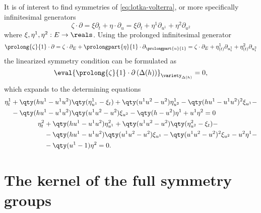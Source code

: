 It is of interest to find symmetries of \cref{eq:lotka-volterra}, or more specifically infinitesimal generators
\begin{equation}
  \zeta \cdot \partial = \xi \partial_t + \eta \cdot \partial_u = \xi \partial_t + \eta^1 \partial_{u^1} + \eta^2 \partial_{u^2}
\end{equation}
where \(\xi, \eta^1, \eta^2: E \to \reals\).
Using the prolonged infinitesimal generator
\begin{equation}
  \prolong{\zeta}{1} \cdot \partial = \zeta \cdot \partial_E + \prolongpart{\eta}{1} \cdot \partial_\prolongpart{u}{1} = \zeta \cdot \partial_E + \eta^1_{(t)} \partial_{u^1_t} + \eta^2_{(t)} \partial_{u^2_t}
\end{equation}
the linearized symmetry condition can be formulated as
\begin{equation} \label{eq:lotka-volterra-lin-symmetry}
  \eval{\prolong{\zeta}{1} \cdot \partial \left(\Delta(h)\right)}_{\variety_{\Delta(h)}} = 0,
\end{equation}
which expands to the determining equations
\begin{subequations}\label{eq:lotka-volterra-det-equations}
  \begin{align}
    \begin{split}
      \eta^1_t &+ \qty(h u^1 - u^1 u^2) \qty(\eta^1_{u^1} - \xi_t) + \qty(u^1 u^2 - u^2) \eta^1_{u^2} - \qty(h u^1 - u^1 u^2)^2 \xi_{u^1} -\\
      &- \qty(h u^1 - u^1 u^2) \qty(u^1 u^2 - u^2) \xi_{u^2} - \qty(h - u^2) \eta^1 + u^1 \eta^2 = 0
    \end{split}\\
    \begin{split}
      \eta^2_t &+ \qty(h u^1 - u^1 u^2) \eta^2_{u^1} + \qty(u^1 u^2 - u^2) \qty(\eta^2_{u^2} - \xi_t) -\\
      &- \qty(h u^1 - u^1 u^2) \qty(u^1 u^2 - u^2) \xi_{u^1} - \qty(u^1 u^2 - u^2)^2 \xi_{u^2} - u^2 \eta^1 -\\
      &- \qty(u^1 - 1) \eta^2 = 0.
    \end{split}
  \end{align}
\end{subequations}

\section{The kernel of the full symmetry groups}

